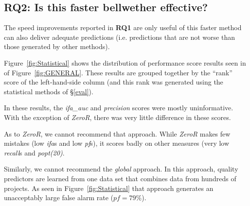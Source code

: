 \documentclass[10pt,journal,compsoc]{IEEEtran}
\newcommand{\fig}[1]{Figure~\ref{fig:#1}}
\newenvironment{result}
{\vspace{0.15cm}
\noindent\begin{minipage}{\linewidth}
\begin{center}
\arrayrulecolor{lightergray}
\begin{tabular}{|p{0.95\linewidth}|}
\hline%
\rowcolor{lightergray}%
\textbf{Result:}~%
}
{\\\hline
\end{tabular}
\end{center}
\end{minipage}
\vspace{0.15cm}
}
\begin{document}







 

\subsection*{RQ2: Is this faster bellwether effective?}
\label{sec:rq3}

The speed improvements reported in {\bf RQ1} are only useful
of this faster method can also deliver adequate predictions
(i.e. predictions that are not worse
than those generated by other methods).

 
Figure~\ref{fig:Statistical} shows the distribution of
performance score results seen in
of \fig{GENERAL}. These results are grouped together by the ``rank'' score
of the left-hand-side column 
(and this rank was generated using the statistical methods of
\S\ref{eval}).


In these results, the {\em ifa\_auc}  and {\em precision} scores
were mostly uninformative. With the exception of {\em ZeroR},
there was very little difference in these scores.

As to {\em ZeroR}, we cannot recommend that approach.
While {\em ZeroR} 
makes few mistakes (low {\em ifa}s and low {\em pf}s), it scores badly
on   other measures (very low {\em recall}s  and {\em popt(20)}.

Similarly, we cannot recommend the    {\em global} approach.
In this approach, quality predictors are learned from   one data set that combines
data from hundreds of projects. As seen in Figure~\ref{fig:Statistical} 
that approach generates an unacceptably large false alarm rate ($pf=79\%$).
\end{document}
